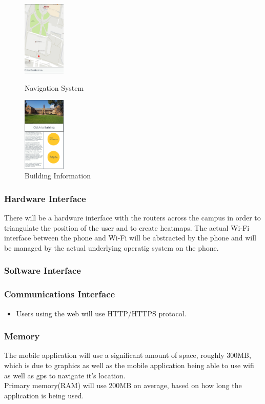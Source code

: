 \documentclass{article}
\begin{document}
\begin{figure}[h]
\centering
\begin{minipage}{.5\textwidth}
	\centering
	\includegraphics[width=2cm]{Navigation}
	\caption{Navigation System}
\end{minipage}%
\begin{minipage}{.5\textwidth}
	\centering
	\includegraphics[width=2cm]{BuildingInfo}
	\caption{Building Information}
\end{minipage}%
\end{figure}


            \subsubsection{Hardware Interface}

			There will be a hardware interface with the routers across the campus in order to triangulate the position of the user and to create heatmaps. The actual Wi-Fi interface between the phone and Wi-Fi will be abstracted by the phone and will be managed by the actual underlying operatig system on the phone.
		
		
            \subsubsection{Software Interface}
            \subsubsection{Communications Interface} \begin{itemize}
	    \item Users using the web will use HTTP/HTTPS protocol.
	    \end{itemize}
            \subsubsection{Memory}
	    {The mobile application will use a significant amount of space, roughly 300MB, which is due to graphics as well as the mobile application being able to use wifi as well as gps to navigate it's location.\\
Primary memory(RAM) will use 200MB on average, based on how long the application is being used.}
\end{document}
